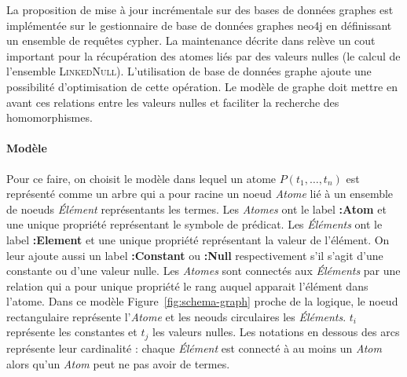 La proposition de mise à jour incrémentale sur des bases de données graphes est implémentée sur le gestionnaire de base de données graphes \gls{neo4j} en définissant un ensemble de requêtes \gls{cypher}.
La maintenance décrite dans \cite{chabinConsistentUpdatingDatabases2020} relève un cout important pour la récupération des atomes liés par des valeurs nulles (le calcul de l'ensemble \textsc{LinkedNull}).
L'utilisation de base de données graphe ajoute une possibilité d'optimisation de cette opération.
Le modèle de graphe doit mettre en avant ces relations entre les valeurs nulles et faciliter la recherche des homomorphismes.

\paragraph{Modèle}
Pour ce faire, on choisit le modèle dans lequel un atome $P(t_1, \dots, t_n)$ est représenté comme un arbre qui a pour racine un noeud \textit{Atome} lié à un ensemble de noeuds \textit{Élément} représentants les termes.
Les \textit{Atomes} ont le label \textbf{:Atom} et une unique propriété représentant le symbole de prédicat.
Les \textit{Éléments} ont le label \textbf{:Element} et une unique propriété représentant la valeur de l'élément.
On leur ajoute aussi un label \textbf{:Constant} ou \textbf{:Null} respectivement s'il s'agit d'une constante ou d'une valeur nulle.
Les \textit{Atomes} sont connectés aux \textit{Éléments} par une relation qui a pour unique propriété le rang auquel apparait l'élément dans l'atome.
Dans ce modèle Figure~\ref{fig:schema-graph} proche de la logique, le noeud rectangulaire représente l'\textit{Atome} et les neouds circulaires les \textit{Éléments}.
$t_i$ représente les constantes et $t_j$ les valeurs nulles.
Les notations en dessous des arcs représente leur cardinalité : chaque \textit{Élément} est connecté à au moins un \textit{Atom} alors qu'un \textit{Atom} peut ne pas avoir de termes.

